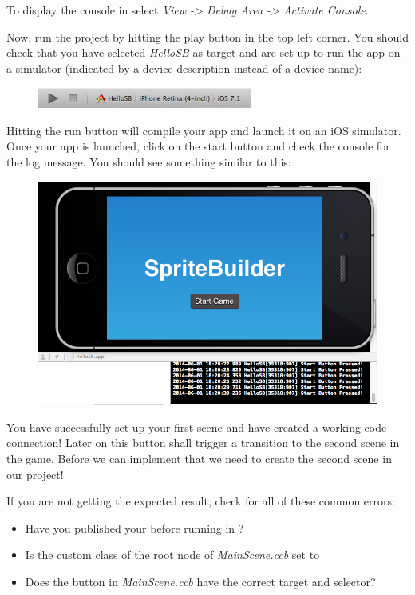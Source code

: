 \begin{lamp}[frametitle={Displaying the console in \xcode{}}] 
To display the console in \xcode{} select \textit{View -> Debug Area ->
Activate Console}.
\end{lamp}

Now, run the \xcode{} project by hitting the play button in the top left corner.
You should check that you have selected \textit{HelloSB} as target and are set
up to run the app on a simulator (indicated by a device description instead of
a device name):
\begin{figure}[H]
		\centering
		\includegraphics[width=200pt]{images/firstproject/run_app.png}
\end{figure}
Hitting the run button will compile your app and launch it on an iOS simulator.
Once your app is launched, click on the start button and check the console for
the log message. You should see something similar to this:

\begin{figure}[H]
		\centering
		\includegraphics[width=0.9\linewidth]{images/firstproject/button_success_log.png}
\end{figure}

You have successfully set up your first \SB{} scene and have created a working
code connection! Later on this button shall trigger a transition to the second
scene in the game. Before we can implement that we need to create the second
scene in our \SB{} project!


\begin{error}
If you are not getting the expected result, check for all of these common
errors:
\begin{itemize}
  \item Have you published your \SB{} before running in \xcode{}?
  \item Is the custom class of the root node of \textit{MainScene.ccb} set to
  \item Does the button in \textit{MainScene.ccb} have the correct target and
  selector?
\end{itemize}
\end{error}


